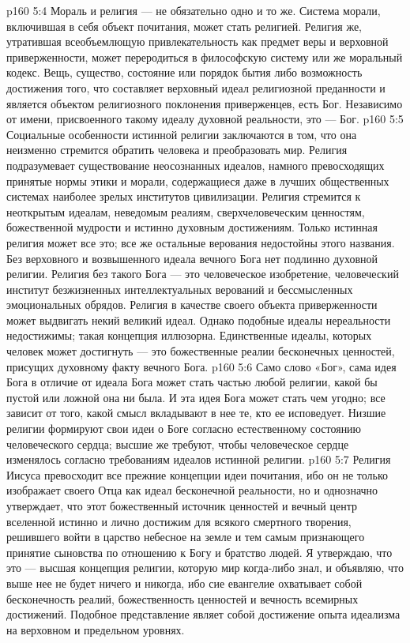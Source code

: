 \vs p160 5:4 Мораль и религия --- не обязательно одно и то же. Система морали, включившая в себя объект почитания, может стать религией. Религия же, утратившая всеобъемлющую привлекательность как предмет веры и верховной приверженности, может переродиться в философскую систему или же моральный кодекс. Вещь, существо, состояние или порядок бытия либо возможность достижения того, что составляет верховный идеал религиозной преданности и является объектом религиозного поклонения приверженцев, есть Бог. Независимо от имени, присвоенного такому идеалу духовной реальности, это --- Бог.
\vs p160 5:5 Социальные особенности истинной религии заключаются в том, что она неизменно стремится обратить человека и преобразовать мир. Религия подразумевает существование неосознанных идеалов, намного превосходящих принятые нормы этики и морали, содержащиеся даже в лучших общественных системах наиболее зрелых институтов цивилизации. Религия стремится к неоткрытым идеалам, неведомым реалиям, сверхчеловеческим ценностям, божественной мудрости и истинно духовным достижениям. Только истинная религия может все это; все же остальные верования недостойны этого названия. Без верховного и возвышенного идеала вечного Бога нет подлинно духовной религии. Религия без такого Бога --- это человеческое изобретение, человеческий институт безжизненных интеллектуальных верований и бессмысленных эмоциональных обрядов. Религия в качестве своего объекта приверженности может выдвигать некий великий идеал. Однако подобные идеалы нереальности недостижимы; такая концепция иллюзорна. Единственные идеалы, которых человек может достигнуть --- это божественные реалии бесконечных ценностей, присущих духовному факту вечного Бога.
\vs p160 5:6 Само слово «Бог», сама идея Бога в отличие от идеала Бога может стать частью любой религии, какой бы пустой или ложной она ни была. И эта идея Бога может стать чем угодно; все зависит от того, какой смысл вкладывают в нее те, кто ее исповедует. Низшие религии формируют свои идеи о Боге согласно естественному состоянию человеческого сердца; высшие же требуют, чтобы человеческое сердце изменялось согласно требованиям идеалов истинной религии.
\vs p160 5:7 \pc Религия Иисуса превосходит все прежние концепции идеи почитания, ибо он не только изображает своего Отца как идеал бесконечной реальности, но и однозначно утверждает, что этот божественный источник ценностей и вечный центр вселенной истинно и лично достижим для всякого смертного творения, решившего войти в царство небесное на земле и тем самым признающего принятие сыновства по отношению к Богу и братство людей. Я утверждаю, что это --- высшая концепция религии, которую мир когда\hyp{}либо знал, и объявляю, что выше нее не будет ничего и никогда, ибо сие евангелие охватывает собой бесконечность реалий, божественность ценностей и вечность всемирных достижений. Подобное представление являет собой достижение опыта идеализма на верховном и предельном уровнях.
